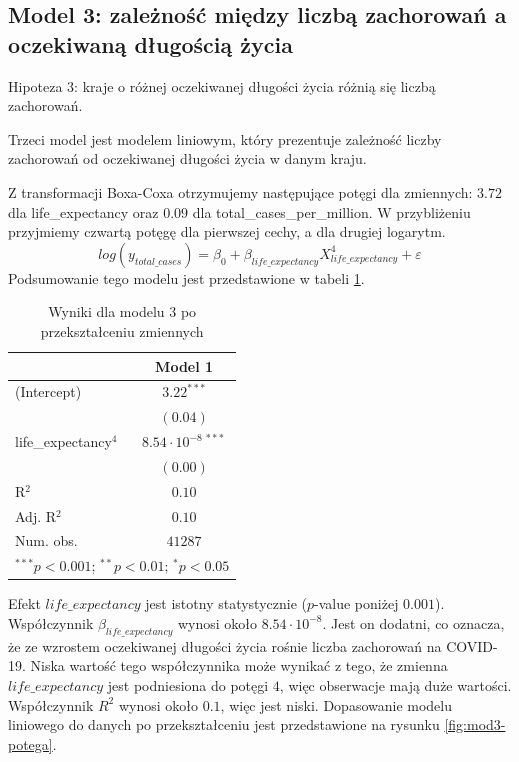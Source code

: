\documentclass[12pt]{mwbk}
\theoremstyle{plain}
\theoremstyle{definition}
\theoremstyle{remark}
\begin{document}
\newpage


\subsection{Model 3: zależność między liczbą zachorowań a oczekiwaną długością życia}


Hipoteza 3: kraje o różnej oczekiwanej długości życia różnią się liczbą zachorowań.

Trzeci model jest modelem liniowym, który prezentuje zależność liczby zachorowań od oczekiwanej długości życia w danym kraju.

Z transformacji Boxa-Coxa otrzymujemy następujące potęgi dla zmiennych: $3.72$ dla life\_expectancy oraz $0.09$ dla total\_cases\_per\_million. W przybliżeniu przyjmiemy czwartą potęgę dla pierwszej cechy, a dla drugiej logarytm.
$$log(y_{total\_cases})=\beta_0+\beta_{life\_expectancy}X_{life\_expectancy}^4+\varepsilon$$
Podsumowanie tego modelu jest przedstawione w tabeli \ref{table:mod3-potega}.


\begin{table}[!htbp]
	\begin{center}
		\begin{tabular}{l c}
		\hline
		& Model 1 \\
		\hline
		(Intercept)          & $3.22^{***}$ \\
		& $(0.04)$     \\
		life\_expectancy$^4$ & $8.54\cdot10^{-8~  ***}$ \\
		& $(0.00)$     \\
		\hline
		R$^2$                & $0.10$       \\
		Adj. R$^2$           & $0.10$       \\
		Num. obs.            & $41287$      \\
		\hline
		\multicolumn{2}{l}{\scriptsize{$^{***}p<0.001$; $^{**}p<0.01$; $^{*}p<0.05$}}
	\end{tabular}
		\caption{Wyniki dla modelu 3 po przekształceniu zmiennych}
		\label{table:mod3-potega}
	\end{center}
\end{table}

Efekt $life\_expectancy$ jest istotny statystycznie ($p$-value poniżej $0.001$). Współczynnik $\beta_{life\_expectancy}$ wynosi około $8.54 \cdot 10^{-8}$. Jest on dodatni, co oznacza, że ze wzrostem oczekiwanej długości życia rośnie liczba zachorowań na COVID-19. Niska wartość tego współczynnika może wynikać z tego, że zmienna $life\_expectancy$ jest podniesiona do potęgi $4$, więc obserwacje mają duże wartości. Współczynnik $R^2$ wynosi około $0.1$, więc jest niski. Dopasowanie modelu liniowego do danych po przekształceniu jest przedstawione na rysunku \ref{fig:mod3-potega}.
\end{document}
